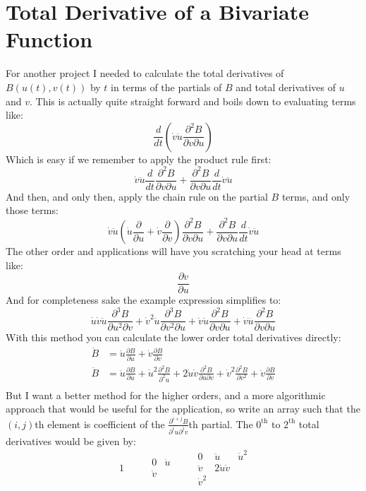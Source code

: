 
\section{Total Derivative of a Bivariate Function}
For another project I needed to calculate the total derivatives of $B(u(t),v(t))$ by $t$ in terms of the partials of $B$ and total derivatives of $u$ and $v$.
This is actually quite straight forward and boils down to evaluating terms like:
\[\frac{d}{dt}\left(\dot{v}\ddot{u}\frac{\partial^2 B}{\partial v\partial u}\right)\]
Which is easy if we remember to apply the product rule first:
\[\dot{v}\ddot{u}\frac{d}{dt}\frac{\partial^2 B}{\partial v\partial u}+\frac{\partial^2 B}{\partial v\partial u}\frac{d}{dt}\dot{v}\ddot{u}\]
And then,
and only then,
apply the chain rule on the partial $B$ terms,
and only those terms:
\[\dot{v}\ddot{u}\left(\dot{u}\frac{\partial}{\partial u}+\dot{v}\frac{\partial}{\partial v}\right)\frac{\partial^2 B}{\partial v\partial u}+\frac{\partial^2 B}{\partial v\partial u}\frac{d}{dt}\dot{v}\ddot{u}\]
The other order and applications will have you scratching your head at terms like:
\[\frac{\partial\ddot{v}}{\partial u}\]
And for completeness sake the example expression simplifies to:
\[\dot{u}\dot{v}\ddot{u}\frac{\partial^3B}{\partial u^2\partial v}+\dot{v}^2\ddot{u}\frac{\partial^3 B}{\partial v^2\partial u}+\ddot{v}\ddot{u}\frac{\partial^2 B}{\partial v\partial u}+\dot{v}\dddot{u}\frac{\partial^2 B}{\partial v\partial u}\]
With this method you can calculate the lower order total derivatives directly:
\[\begin{aligned}
	\dot{B} &= \dot{u}\frac{\partial B}{\partial u}+\dot{v}\frac{\partial B}{\partial v}\\
	\ddot{B} &= \ddot{u}\frac{\partial B}{\partial u}+\dot{u}^2\frac{\partial^2 B}{\partial^2 u}+2\dot{u}\dot{v}\frac{\partial^2 B}{\partial u\partial v}+\dot{v}^2\frac{\partial^2 B}{\partial v^2}+\ddot{v}\frac{\partial B}{\partial v}\\
\end{aligned}\]
But I want a better method for the higher orders,
and a more algorithmic approach that would be useful for the application,
so write an array such that the $(i,j)$th element is coefficient of the $\frac{\partial^{i+j} B}{\partial^i u\partial^j v}$th partial.
The $0^\text{th}$ to $2^\text{th}$ total derivatives would be given by:
\[
\begin{matrix}
1
\end{matrix}
\quad\quad
\begin{matrix}
	0&\dot{u}\\\dot{v}
\end{matrix}
\quad\quad
\begin{matrix}
	0&\ddot{u}&\dot{u}^2\\
	\ddot{v}&2\dot{u}\dot{v}\\
	\dot{v}^2
\end{matrix}
\]

